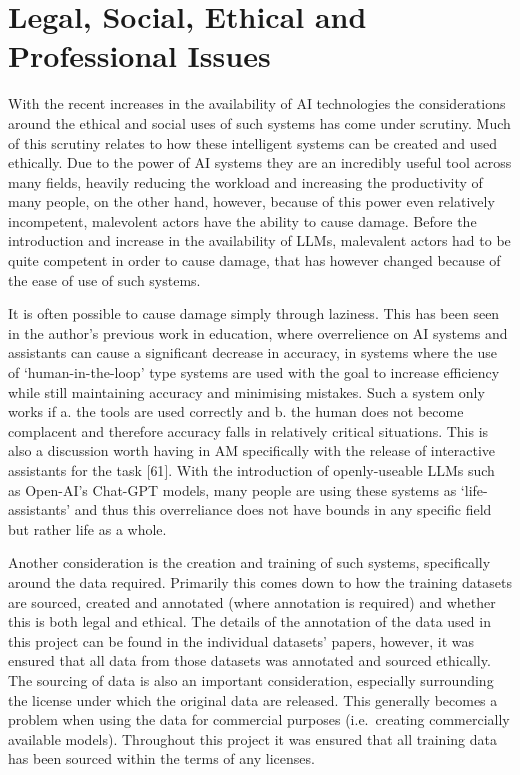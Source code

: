 \documentclass[twocolumn,twoside]{article}
\begin{document}
\section{Legal, Social, Ethical and Professional
Issues}\label{legal-social-ethical-and-professional-issues}

With the recent increases in the availability of AI technologies the
considerations around the ethical and social uses of such systems has
come under scrutiny. Much of this scrutiny relates to how these
intelligent systems can be created and used ethically. Due to the power
of AI systems they are an incredibly useful tool across many fields,
heavily reducing the workload and increasing the productivity of many
people, on the other hand, however, because of this power even
relatively incompetent, malevolent actors have the ability to cause
damage. Before the introduction and increase in the availability of
LLMs, malevalent actors had to be quite competent in order to cause
damage, that has however changed because of the ease of use of such
systems.

It is often possible to cause damage simply through laziness. This has
been seen in the author's previous work in education, where overrelience
on AI systems and assistants can cause a significant decrease in
accuracy, in systems where the use of `human-in-the-loop' type systems
are used with the goal to increase efficiency while still maintaining
accuracy and minimising mistakes. Such a system only works if a. the
tools are used correctly and b. the human does not become complacent and
therefore accuracy falls in relatively critical situations. This is also
a discussion worth having in AM specifically with the release of
interactive assistants for the task {[}61{]}. With the introduction of
openly-useable LLMs such as Open-AI's Chat-GPT models, many people are
using these systems as `life-assistants' and thus this overreliance does
not have bounds in any specific field but rather life as a whole.

Another consideration is the creation and training of such systems,
specifically around the data required. Primarily this comes down to how
the training datasets are sourced, created and annotated (where
annotation is required) and whether this is both legal and ethical. The
details of the annotation of the data used in this project can be found
in the individual datasets' papers, however, it was ensured that all
data from those datasets was annotated and sourced ethically. The
sourcing of data is also an important consideration, especially
surrounding the license under which the original data are released. This
generally becomes a problem when using the data for commercial purposes
(i.e.~creating commercially available models). Throughout this project
it was ensured that all training data has been sourced within the terms
of any licenses.
\end{document}
